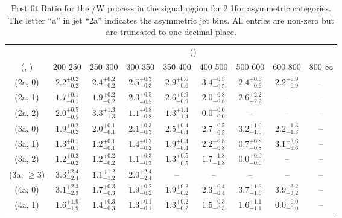 \begin{table}[h!]
\tiny
\centering
\caption{Post fit Ratio for the \ttbar/W process in the signal region for 2.1\ifb for asymmetric categories. The letter ``a'' in jet \eg ``2a''  indicates the asymmetric jet bins. All entries are non-zero but are truncated to one decimal place.\label{tab:ratioseppost_sig_ttw_asym}}
\begin{tabular}
{ccccccccc}
	\hline\hline
	& \multicolumn{8}{c}{\scalht (\gev)} \\ 
	 (\njet,  \nb) & 200-250 & 250-300 & 300-350 & 350-400 & 400-500 & 500-600 & 600-800 & 800-$\infty$ \\ [0.8ex] 
\hline
	(2a, 0) & $2.2^{+ 0.2 }_{- 0.2 }$ & $2.4^{+ 0.2 }_{- 0.2 }$ & $2.5^{+ 0.3 }_{- 0.3 }$ & $2.9^{+ 0.6 }_{- 0.6 }$ & $3.4^{+ 0.5 }_{- 0.5 }$ & $2.4^{+ 0.6 }_{- 0.6 }$ & $2.2^{+ 0.9 }_{- 0.9 }$ & -- \\[0.5ex] 
	(2a, 1) & $1.7^{+ 0.1 }_{- 0.1 }$ & $1.9^{+ 0.2 }_{- 0.2 }$ & $2.3^{+ 0.5 }_{- 0.5 }$ & $2.6^{+ 0.9 }_{- 0.9 }$ & $2.0^{+ 0.8 }_{- 0.8 }$ & $2.6^{+ 2.2 }_{- 2.2 }$ & -- & -- \\[0.5ex] 
	(2a, 2) & $2.0^{+ 0.5 }_{- 0.5 }$ & $3.3^{+ 1.3 }_{- 1.3 }$ & $1.1^{+ 0.8 }_{- 0.8 }$ & $1.3^{+ 1.4 }_{- 1.4 }$ & $0.0^{+ 0.0 }_{- 0.0 }$ & -- & -- & -- \\[0.5ex] 
	(3a, 0) & $1.9^{+ 0.2 }_{- 0.2 }$ & $2.0^{+ 0.1 }_{- 0.1 }$ & $2.1^{+ 0.3 }_{- 0.3 }$ & $2.5^{+ 0.4 }_{- 0.4 }$ & $2.7^{+ 0.5 }_{- 0.5 }$ & $3.2^{+ 1.0 }_{- 1.0 }$ & $2.2^{+ 1.3 }_{- 1.3 }$ & -- \\[0.5ex] 
	(3a, 1) & $1.3^{+ 0.1 }_{- 0.1 }$ & $1.2^{+ 0.1 }_{- 0.1 }$ & $1.4^{+ 0.2 }_{- 0.2 }$ & $1.9^{+ 0.4 }_{- 0.4 }$ & $2.2^{+ 0.8 }_{- 0.8 }$ & $0.7^{+ 0.8 }_{- 0.8 }$ & $3.1^{+ 3.6 }_{- 3.6 }$ & -- \\[0.5ex] 
	(3a, 2) & $1.2^{+ 0.2 }_{- 0.2 }$ & $1.2^{+ 0.2 }_{- 0.2 }$ & $1.1^{+ 0.3 }_{- 0.3 }$ & $1.3^{+ 0.5 }_{- 0.5 }$ & $1.7^{+ 1.8 }_{- 1.8 }$ & $0.0^{+ 0.0 }_{- 0.0 }$ & -- & -- \\[0.5ex] 
	(3a, $\ge3$) & $3.3^{+ 2.4 }_{- 2.4 }$ & $1.1^{+ 1.2 }_{- 1.2 }$ & $2.0^{+ 2.4 }_{- 2.4 }$ & -- & -- & -- & -- & -- \\[0.5ex] 
	(4a, 0) & $3.1^{+ 2.3 }_{- 2.3 }$ & $1.7^{+ 0.3 }_{- 0.3 }$ & $1.9^{+ 0.2 }_{- 0.2 }$ & $1.9^{+ 0.2 }_{- 0.2 }$ & $2.3^{+ 0.4 }_{- 0.4 }$ & $3.7^{+ 1.6 }_{- 1.6 }$ & $3.9^{+ 3.2 }_{- 3.2 }$ & -- \\[0.5ex] 
	(4a, 1) & $1.6^{+ 1.9 }_{- 1.9 }$ & $1.4^{+ 0.3 }_{- 0.3 }$ & $1.3^{+ 0.1 }_{- 0.1 }$ & $1.3^{+ 0.2 }_{- 0.2 }$ & $1.5^{+ 0.3 }_{- 0.3 }$ & $1.6^{+ 1.1 }_{- 1.1 }$ & $0.0^{+ 0.0 }_{- 0.0 }$ & -- \\[0.5ex] 

\end{tabular}
\end{table}
